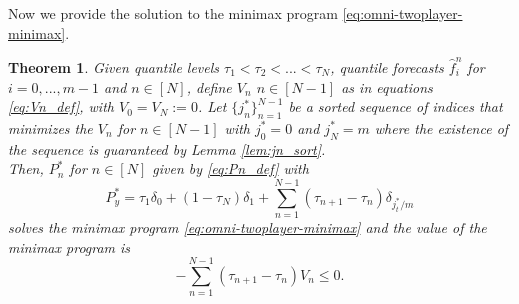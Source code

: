 \documentclass{article}
\newtheorem{theorem}{Theorem}
\newcommand{\indi}[1]{\mathds{1}\{#1\}}
\begin{document}
Now we provide the solution to the minimax program \eqref{eq:omni-twoplayer-minimax}.
\begin{theorem}\label{thm:minimax_negative_multi_q}
Given quantile levels $\tau_1 < \tau_2 < ... < \tau_N$, quantile forecasts $\hat{f}_i^n$ for $i =0,...,m\!-\!1$ and $n \in [N]$, define $V_n$ $n \in [N-1]$ as in equations \eqref{eq:Vn_def}, with $V_0 = V_N := 0$. Let $\{j_n^*\}_{n=1}^{N-1}$ be a sorted sequence of indices that minimizes the $V_n$ for $n \in [N-1]$ with $j_0^* = 0$ and $j_N^* = m$ where the existence of the sequence is guaranteed by Lemma \ref{lem:jn_sort}. 
\smallskip \\
Then, $P_n^*$ for $n \in [N]$ given by \eqref{eq:Pn_def} with 
\[
P_y^* = \tau_1 \delta_0 + (1-\tau_N)\delta_1 + \sum_{n=1}^{N-1}(\tau_{n+1}-\tau_n)\delta_{j_t^*/m}
\]
solves the minimax program \eqref{eq:omni-twoplayer-minimax} and the value of the minimax program is 
\[
-\sum_{n=1}^{N-1}(\tau_{n+1}-\tau_n)V_n \leq 0.
\]


\end{theorem}
\end{document}
